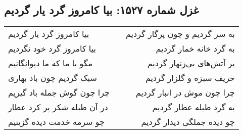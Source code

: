 \begin{center}
\section*{غزل شماره ۱۵۲۷: بیا کامروز گرد یار گردیم}
\label{sec:1527}
\begin{longtable}{l p{0.5cm} r}
بیا کامروز گرد یار گردیم
&&
به سر گردیم و چون پرگار گردیم
\\
بیا کامروز گرد خود نگردیم
&&
به گرد خانه خمار گردیم
\\
مگو با ما که ما دیوانگانیم
&&
بر آتش‌های بی‌زنهار گردیم
\\
سبک گردیم چون باد بهاری
&&
حریف سبزه و گلزار گردیم
\\
چرا چون گوش جمله باد گیریم
&&
چرا چون موش در انبار گردیم
\\
در آن طبله شکر پر کرد عطار
&&
به گرد طبله عطار گردیم
\\
چو سرمه خدمت دیده گزینیم
&&
چو دیده جملگی دیدار گردیم
\\
\end{longtable}
\end{center}
